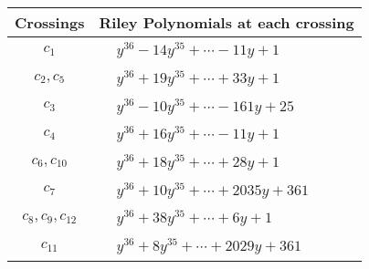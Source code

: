 \documentclass[1p]{elsarticle_modified}
\theoremstyle{definition}
\begin{document}
\begin{tabular}{m{50pt}|m{274pt}}
Crossings & \hspace{64pt}Riley Polynomials at each crossing \\
\hline $$\begin{aligned}c_{1}\end{aligned}$$&$\begin{aligned}
&y^{36}-14 y^{35}+\cdots-11 y+1
\end{aligned}$\\
\hline $$\begin{aligned}c_{2},c_{5}\end{aligned}$$&$\begin{aligned}
&y^{36}+19 y^{35}+\cdots+33 y+1
\end{aligned}$\\
\hline $$\begin{aligned}c_{3}\end{aligned}$$&$\begin{aligned}
&y^{36}-10 y^{35}+\cdots-161 y+25
\end{aligned}$\\
\hline $$\begin{aligned}c_{4}\end{aligned}$$&$\begin{aligned}
&y^{36}+16 y^{35}+\cdots-11 y+1
\end{aligned}$\\
\hline $$\begin{aligned}c_{6},c_{10}\end{aligned}$$&$\begin{aligned}
&y^{36}+18 y^{35}+\cdots+28 y+1
\end{aligned}$\\
\hline $$\begin{aligned}c_{7}\end{aligned}$$&$\begin{aligned}
&y^{36}+10 y^{35}+\cdots+2035 y+361
\end{aligned}$\\
\hline $$\begin{aligned}c_{8},c_{9},c_{12}\end{aligned}$$&$\begin{aligned}
&y^{36}+38 y^{35}+\cdots+6 y+1
\end{aligned}$\\
\hline $$\begin{aligned}c_{11}\end{aligned}$$&$\begin{aligned}
&y^{36}+8 y^{35}+\cdots+2029 y+361
\end{aligned}$\\
\hline
\end{tabular}\\~\\
\end{document}
